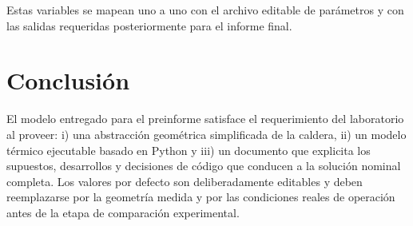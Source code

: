 \documentclass[conference]{IEEEtran}
\begin{document}
Estas variables se mapean uno a uno con el archivo editable de par\'ametros y con las salidas requeridas posteriormente para el informe final.

\section{Conclusi\'on}
El modelo entregado para el preinforme satisface el requerimiento del laboratorio al proveer: i) una abstracci\'on geom\'etrica simplificada de la caldera, ii) un modelo t\'ermico ejecutable basado en Python y iii) un documento que explicita los supuestos, desarrollos y decisiones de c\'odigo que conducen a la soluci\'on nominal completa. Los valores por defecto son deliberadamente editables y deben reemplazarse por la geometr\'ia medida y por las condiciones reales de operaci\'on antes de la etapa de comparaci\'on experimental.



\end{document}

